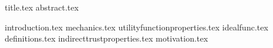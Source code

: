 \documentclass[11pt]{llncs}
\begin{document}
{title.tex}
\thispagestyle{plain}
{abstract.tex}

{introduction.tex}
{mechanics.tex}
{utilityfunctionproperties.tex}
{idealfunc.tex}
{definitions.tex}
{indirecttrustproperties.tex}
{motivation.tex}

\end{document}
